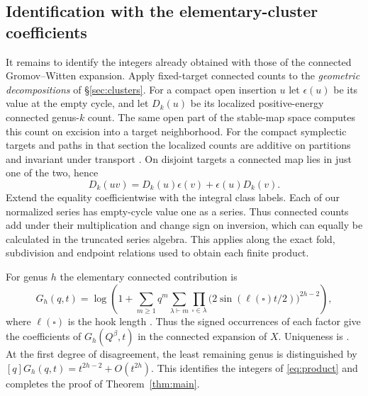 \subsection{Identification with the elementary-cluster coefficients}
It remains to identify the integers already obtained with those of
the connected Gromov--Witten expansion. Apply fixed-target connected
counts to the \emph{geometric decompositions} of
\S\ref{sec:clusters}. For a compact open insertion $u$ let
$\epsilon(u)$ be its value at the empty cycle, and let $D_k(u)$ be
its localized positive-energy connected genus-$k$ count. The same
open part of the stable-map space computes this count on excision
into a target neighborhood. For the compact symplectic targets
and paths in that section the localized counts are additive on
partitions and invariant under transport
\cite[Lemma~3.8 and Proposition~3.10]{DIW}. On disjoint targets a
connected map lies in just one of the two, hence
\[
                D_k(uv)=D_k(u)\epsilon(v)+\epsilon(u)D_k(v).
\]
Extend the equality coefficientwise with the integral class labels.
Each of our normalized series has empty-cycle value one as a series.
Thus connected counts add under their multiplication and change sign
on inversion, which can equally be calculated in the truncated
series algebra. This applies along the exact fold, subdivision and
endpoint relations used to obtain each finite product.

For genus $h$ the elementary connected contribution is
\[
 G_h(q,t)=\log\!\left(1+
 \sum_{m\ge1}q^m\sum_{\lambda\vdash m}
       \prod_{\square\in\lambda}
           \bigl(2\sin(\ell(\square)t/2)\bigr)^{2h-2}\right),
\]
where $\ell(\square)$ is the hook length \cite[Proposition~3.3]{IP}.
Thus the signed occurrences of each factor give the coefficients of
$G_h(Q^\beta,t)$ in the connected expansion of $X$. Uniqueness is
\cite[Theorem~3.50]{DIW}. At the first degree of disagreement, the
least remaining genus is distinguished by
$[q]G_h(q,t)=t^{2h-2}+O(t^{2h})$. This identifies the integers of
\eqref{eq:product} and completes the proof of Theorem~\ref{thm:main}.
